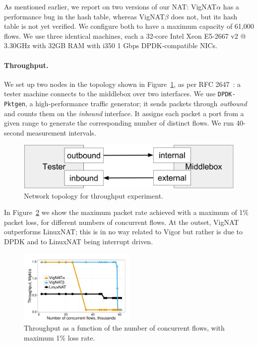 \documentclass[letterpaper,twocolumn,10pt]{article}
\newcommand{\code}[1]{\texttt{#1}}
\newcommand{\vignat}{{\sc VigNAT}\xspace}
\newcommand{\vignata}{{\sc VigNAT$\alpha$}\xspace}
\newcommand{\vignatb}{{\sc VigNAT$\beta$}\xspace}
\begin{document}
{As mentioned earlier, we report on two versions of our NAT: \vignata has a performance bug in the hash table, whereas \vignatb does not, but its hash table is not yet verified. We configure both to have a maximum capacity of 61,000 flows. We use three identical machines, each a 32-core Intel Xeon E5-2667 v2 @ 3.30GHz with 32GB RAM with i350 1 Gbps DPDK-compatible NICs. 


\paragraph{Throughput.}

We set up two nodes in the topology shown in Figure~\ref{fig:throughput-setup}, as per RFC 2647~\cite{rfc2544}: a tester machine connects to the middlebox over two interfaces. We use \code{DPDK-Pktgen}, a high-performance traffic generator; it sends packets through {\em outbound} and counts them on the {\em inbound} interface. It assigns each packet a port from a given range to generate the corresponding number of distinct flows. We run 40-second measurement intervals.

\begin{figure}[h!]
    \includegraphics[width=\columnwidth]{figures/throughput_setup.png}
    \caption{Network topology for throughput experiment.}
    \label{fig:throughput-setup}
\end{figure}

In Figure~\ref{fig:throughput-overall} we show the maximum packet rate achieved with a maximum of 1\% packet loss, for different numbers of concurrent flows. At the outset, \vignat outperforms LinuxNAT; this is in no way related to Vigor but rather is due to DPDK and to LinuxNAT being interrupt driven. %

\begin{figure}[]
    \centering
    \includegraphics[width=0.5\textwidth]{plots/brpt.pdf}
    \caption{Throughput as a function of the number of concurrent flows, with maximum 1\% loss rate.}
    \label{fig:throughput-overall}
\end{figure}

}
\end{document}
